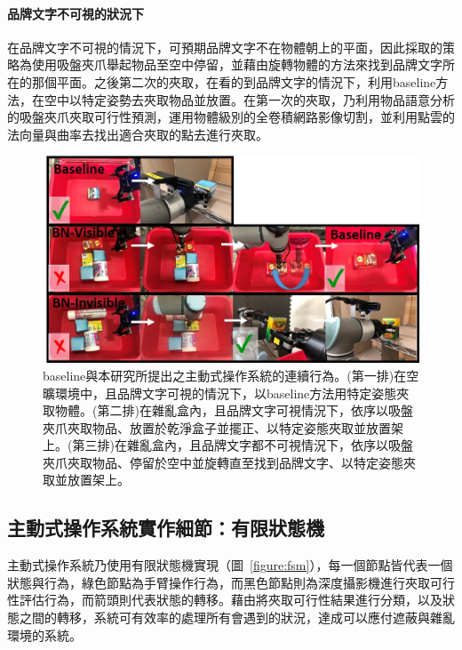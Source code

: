 \paragraph{品牌文字不可視的狀況下}
在品牌文字不可視的情況下，可預期品牌文字不在物體朝上的平面，因此採取的策略為使用吸盤夾爪舉起物品至空中停留，並藉由旋轉物體的方法來找到品牌文字所在的那個平面。之後第二次的夾取，在看的到品牌文字的情況下，利用baseline方法，在空中以特定姿勢去夾取物品並放置。在第一次的夾取，乃利用物品語意分析的吸盤夾爪夾取可行性預測，運用物體級別的全卷積網路影像切割，並利用點雲的法向量與曲率去找出適合夾取的點去進行夾取。

\begin{figure}[H]
	\centering
	\includegraphics[height=!, width=1.0\linewidth, keepaspectratio=true]
	{./figures/active_manipulation_and_baseline.jpg}
  \caption{baseline與本研究所提出之主動式操作系統的連續行為。(第一排)在空曠環境中，且品牌文字可視的情況下，以baseline方法用特定姿態夾取物體。(第二排)在雜亂盒內，且品牌文字可視情況下，依序以吸盤夾爪夾取物品、放置於乾淨盒子並擺正、以特定姿態夾取並放置架上。(第三排)在雜亂盒內，且品牌文字都不可視情況下，依序以吸盤夾爪夾取物品、停留於空中並旋轉直至找到品牌文字、以特定姿態夾取並放置架上。
	}
  \label{figure:active_manipulation_and_baseline}
\end{figure}

\subsection{主動式操作系統實作細節：有限狀態機}

主動式操作系統乃使用有限狀態機實現（圖~\ref{figure:fsm}），每一個節點皆代表一個狀態與行為，綠色節點為手臂操作行為，而黑色節點則為深度攝影機進行夾取可行性評估行為，而箭頭則代表狀態的轉移。藉由將夾取可行性結果進行分類，以及狀態之間的轉移，系統可有效率的處理所有會遇到的狀況，達成可以應付遮蔽與雜亂環境的系統。

